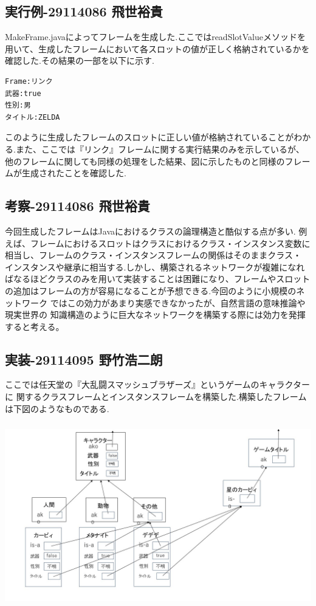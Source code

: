 \documentclass{jarticle}
\begin{document}
\subsection{実行例-29114086 飛世裕貴}
MakeFrame.javaによってフレームを生成した.ここではreadSlotValueメソッドを用いて、生成したフレームにおいて各スロットの値が正しく格納されているかを確認した.その結果の一部を以下に示す.
\\

\begin{screen}
\begin{verbatim}
Frame:リンク
武器:true
性別:男
タイトル:ZELDA
\end{verbatim}
\end{screen}

このように生成したフレームのスロットに正しい値が格納されていることがわかる.また、ここでは『リンク』フレームに関する実行結果のみを示しているが、他のフレームに関しても同様の処理をした結果、図に示したものと同様のフレームが生成されたことを確認した.

\subsection{考察-29114086 飛世裕貴}
今回生成したフレームはJavaにおけるクラスの論理構造と酷似する点が多い.
例えば、フレームにおけるスロットはクラスにおけるクラス・インスタンス変数に
相当し、フレームのクラス・インスタンスフレームの関係はそのままクラス・
インスタンスや継承に相当する.しかし、構築されるネットワークが複雑になれ
ばなるほどクラスのみを用いて実装することは困難になり、フレームやスロット
の追加はフレームの方が容易になることが予想できる.今回のように小規模のネットワーク
ではこの効力があまり実感できなかったが、自然言語の意味推論や現実世界の
知識構造のように巨大なネットワークを構築する際には効力を発揮すると考える。
\subsection{実装-29114095 野竹浩二朗}
ここでは任天堂の『大乱闘スマッシュブラザーズ』というゲームのキャラクターに
関するクラスフレームとインスタンスフレームを構築した.構築したフレームは下図のようなものである.


\includegraphics[width=150mm,height=80mm]{095/Frame-Kirby.jpg}
\end{document}
